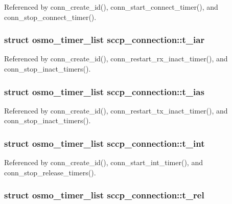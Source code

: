 Referenced by conn\+\_\+create\+\_\+id(), conn\+\_\+start\+\_\+connect\+\_\+timer(), and conn\+\_\+stop\+\_\+connect\+\_\+timer().

\subsubsection[{t\+\_\+iar}]{\setlength{\rightskip}{0pt plus 5cm}struct osmo\+\_\+timer\+\_\+list sccp\+\_\+connection\+::t\+\_\+iar}\label{structsccp__connection_a6df1fd3995de5fa901d4837f70890ebb}


Referenced by conn\+\_\+create\+\_\+id(), conn\+\_\+restart\+\_\+rx\+\_\+inact\+\_\+timer(), and conn\+\_\+stop\+\_\+inact\+\_\+timers().

\subsubsection[{t\+\_\+ias}]{\setlength{\rightskip}{0pt plus 5cm}struct osmo\+\_\+timer\+\_\+list sccp\+\_\+connection\+::t\+\_\+ias}\label{structsccp__connection_a591e4af0e45ad5f3547dc04d5dbf7e18}


Referenced by conn\+\_\+create\+\_\+id(), conn\+\_\+restart\+\_\+tx\+\_\+inact\+\_\+timer(), and conn\+\_\+stop\+\_\+inact\+\_\+timers().

\subsubsection[{t\+\_\+int}]{\setlength{\rightskip}{0pt plus 5cm}struct osmo\+\_\+timer\+\_\+list sccp\+\_\+connection\+::t\+\_\+int}\label{structsccp__connection_af0f26767fc86caca06ec49ba99e2f893}


Referenced by conn\+\_\+create\+\_\+id(), conn\+\_\+start\+\_\+int\+\_\+timer(), and conn\+\_\+stop\+\_\+release\+\_\+timers().

\subsubsection[{t\+\_\+rel}]{\setlength{\rightskip}{0pt plus 5cm}struct osmo\+\_\+timer\+\_\+list sccp\+\_\+connection\+::t\+\_\+rel}\label{structsccp__connection_a605c58a351207fe05303d34b5d041275}



